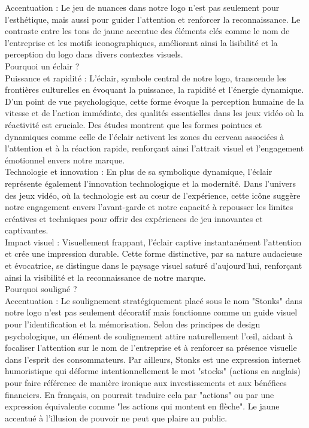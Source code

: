 Accentuation : Le jeu de nuances dans notre logo n'est pas seulement pour l'esthétique, mais aussi pour guider l'attention et renforcer la reconnaissance. Le contraste entre les tons de jaune accentue des éléments clés comme le nom de l'entreprise et les motifs iconographiques, améliorant ainsi la lisibilité et la perception du logo dans divers contextes visuels.
\\

Pourquoi un éclair ?
\\

Puissance et rapidité : L'éclair, symbole central de notre logo, transcende les frontières culturelles en évoquant la puissance, la rapidité et l'énergie dynamique.
D'un point de vue psychologique, cette forme évoque la perception humaine de la vitesse et de l'action immédiate, des qualités essentielles dans les jeux vidéo où la réactivité est cruciale.
Des études montrent que les formes pointues et dynamiques comme celle de l'éclair activent les zones du cerveau associées à l'attention et à la réaction rapide, renforçant ainsi l'attrait visuel et l'engagement émotionnel envers notre marque.
\\

Technologie et innovation : En plus de sa symbolique dynamique, l'éclair représente également l'innovation technologique et la modernité.
Dans l'univers des jeux vidéo, où la technologie est au cœur de l'expérience, cette icône suggère notre engagement envers l'avant-garde et notre capacité à repousser les limites créatives et techniques pour offrir des expériences de jeu innovantes et captivantes.
\\

Impact visuel : Visuellement frappant, l'éclair captive instantanément l'attention et crée une impression durable.
Cette forme distinctive, par sa nature audacieuse et évocatrice, se distingue dans le paysage visuel saturé d'aujourd'hui, renforçant ainsi la visibilité et la reconnaissance de notre marque.
\\

Pourquoi souligné ?
\\

Accentuation : Le soulignement stratégiquement placé sous le nom "Stonks" dans notre logo n'est pas seulement décoratif mais fonctionne comme un guide visuel pour l'identification et la mémorisation.
Selon des principes de design psychologique, un élément de soulignement attire naturellement l'œil, aidant à focaliser l'attention sur le nom de l'entreprise et à renforcer sa présence visuelle dans l'esprit des consommateurs.
Par ailleurs, Stonks est une expression internet humoristique qui déforme intentionnellement le mot "stocks" (actions en anglais) pour faire référence de manière ironique aux investissements et aux bénéfices financiers.
En français, on pourrait traduire cela par "actions" ou par une expression équivalente comme "les actions qui montent en flèche". Le jaune accentué à l'illusion de pouvoir ne peut que plaire au public.
\\

